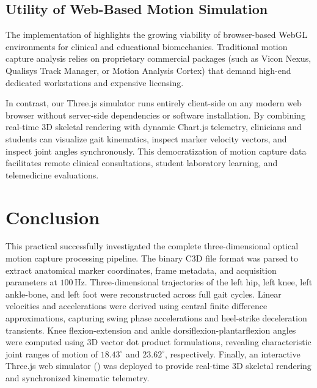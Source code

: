\documentclass[12pt,a4paper]{article}
\newcommand{\csvfile}[1]{\texttt{\detokenize{#1}}}
\begin{document}
\subsection{Utility of Web-Based Motion Simulation}
The implementation of \csvfile{simulator.html} highlights the growing viability of browser-based WebGL environments for clinical and educational biomechanics. Traditional motion capture analysis relies on proprietary commercial packages (such as Vicon Nexus, Qualisys Track Manager, or Motion Analysis Cortex) that demand high-end dedicated workstations and expensive licensing. 

In contrast, our Three.js simulator runs entirely client-side on any modern web browser without server-side dependencies or software installation. By combining real-time 3D skeletal rendering with dynamic Chart.js telemetry, clinicians and students can visualize gait kinematics, inspect marker velocity vectors, and inspect joint angles synchronously. This democratization of motion capture data facilitates remote clinical consultations, student laboratory learning, and telemedicine evaluations.

\section{Conclusion}

This practical successfully investigated the complete three-dimensional optical motion capture processing pipeline. The binary C3D file format was parsed to extract anatomical marker coordinates, frame metadata, and acquisition parameters at $100\,\mathrm{Hz}$. Three-dimensional trajectories of the left hip, left knee, left ankle-bone, and left foot were reconstructed across full gait cycles. Linear velocities and accelerations were derived using central finite difference approximations, capturing swing phase accelerations and heel-strike deceleration transients. Knee flexion-extension and ankle dorsiflexion-plantarflexion angles were computed using 3D vector dot product formulations, revealing characteristic joint ranges of motion of $18.43^\circ$ and $23.62^\circ$, respectively. Finally, an interactive Three.js web simulator (\csvfile{simulator.html}) was deployed to provide real-time 3D skeletal rendering and synchronized kinematic telemetry.
\end{document}

